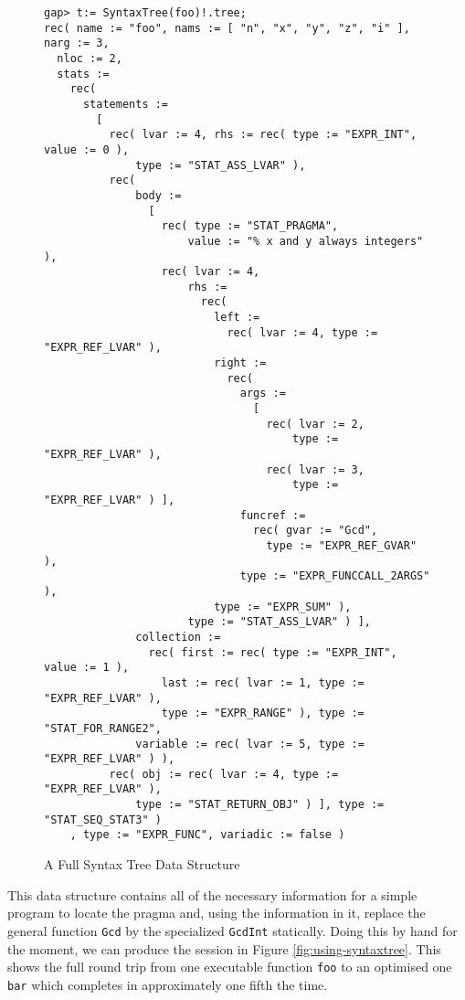 \begin{figure}[!ht]
  \begin{mdframed}
  \begin{Small}
\begin{verbatim}
gap> t:= SyntaxTree(foo)!.tree;
rec( name := "foo", nams := [ "n", "x", "y", "z", "i" ], narg := 3, 
  nloc := 2, 
  stats := 
    rec( 
      statements := 
        [ 
          rec( lvar := 4, rhs := rec( type := "EXPR_INT", value := 0 ), 
              type := "STAT_ASS_LVAR" ), 
          rec( 
              body := 
                [ 
                  rec( type := "STAT_PRAGMA", 
                      value := "% x and y always integers" ), 
                  rec( lvar := 4, 
                      rhs := 
                        rec( 
                          left := 
                            rec( lvar := 4, type := "EXPR_REF_LVAR" ), 
                          right := 
                            rec( 
                              args := 
                                [ 
                                  rec( lvar := 2, 
                                      type := "EXPR_REF_LVAR" ), 
                                  rec( lvar := 3, 
                                      type := "EXPR_REF_LVAR" ) ], 
                              funcref := 
                                rec( gvar := "Gcd", 
                                  type := "EXPR_REF_GVAR" ), 
                              type := "EXPR_FUNCCALL_2ARGS" ), 
                          type := "EXPR_SUM" ), 
                      type := "STAT_ASS_LVAR" ) ], 
              collection := 
                rec( first := rec( type := "EXPR_INT", value := 1 ), 
                  last := rec( lvar := 1, type := "EXPR_REF_LVAR" ), 
                  type := "EXPR_RANGE" ), type := "STAT_FOR_RANGE2", 
              variable := rec( lvar := 5, type := "EXPR_REF_LVAR" ) ), 
          rec( obj := rec( lvar := 4, type := "EXPR_REF_LVAR" ), 
              type := "STAT_RETURN_OBJ" ) ], type := "STAT_SEQ_STAT3" )
    , type := "EXPR_FUNC", variadic := false )
\end{verbatim}
  \end{Small}
  \end{mdframed}
  \caption{A Full Syntax Tree Data Structure}\label{fig:syntaxtree}
  \end{figure}
  

This data structure contains all of the necessary information for
a simple \GAP program to locate the pragma and, using the information
in it, replace the general function \verb|Gcd| by the specialized
\verb|GcdInt| statically.  Doing this by hand for the moment, we can
produce the session in Figure \ref{fig:using-syntaxtree}. This shows 
the full round trip from one executable \GAP function \verb|foo| to an
optimised one \verb|bar| which completes in approximately one fifth the time.

